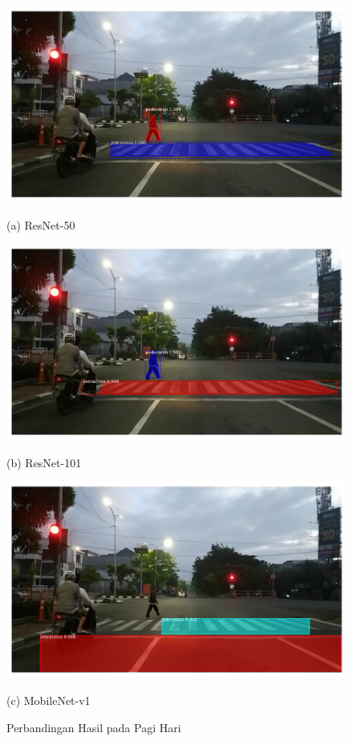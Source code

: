 \begin{figure}[H]
	\centering
	\begin{minipage}[b]{0.3\textwidth}
		\includegraphics[width=\textwidth]{gambar/hasil/resnet-50_fajar_800.png}
		\caption*{(a) ResNet-50}
	\end{minipage}
	\hfill
	\begin{minipage}[b]{0.3\textwidth}
		\includegraphics[width=\textwidth]{gambar/hasil/resnet-101_fajar_800.png}
		\caption*{(b) ResNet-101}
	\end{minipage}
	\hfill
	\begin{minipage}[b]{0.3\textwidth}
		\includegraphics[width=\textwidth]{gambar/fajar-frame800-mobilenetv1.png}
		\caption*{(c) MobileNet-v1}
	\end{minipage}
	\caption{{Perbandingan Hasil pada Pagi Hari}}
	\label{fig:comparasion-morning}
\end{figure}


